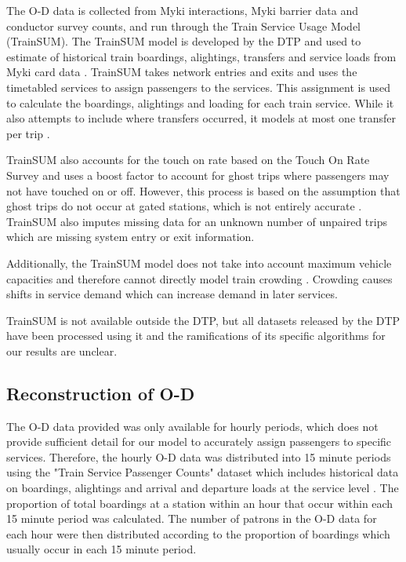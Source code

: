 The O-D data is collected from Myki interactions, Myki barrier data and conductor survey counts, and run through the Train Service Usage Model (TrainSUM). %
The TrainSUM model is developed by the DTP and used to estimate of historical train boardings, alightings, transfers and service loads from Myki card data \cite{rossmannRidespacePredictingShortterm2022}. TrainSUM takes network entries and exits and uses the timetabled services to assign passengers to the services. This assignment is used to calculate the boardings, alightings and loading for each train service. While it also attempts to include where transfers occurred, it models at most one transfer per trip \cite{victoriandepartmentoftransportandplanningTrainServicePassenger2024}.

TrainSUM also accounts for the touch on rate based on the Touch On Rate Survey and uses a boost factor to account for ghost trips where passengers may not have touched on or off. However, this process is based on the assumption that ghost trips do not occur at gated stations, which is not entirely accurate \cite{rossmannRidespacePredictingShortterm2022}. TrainSUM also imputes missing data for an unknown number of unpaired trips which are missing system entry or exit information. 

Additionally, the TrainSUM model does not take into account maximum vehicle capacities and therefore cannot directly model train crowding \cite{victoriandepartmentoftransportandplanningTrainServicePassenger2024}. Crowding causes shifts in service demand which can increase demand in later services. 

TrainSUM is not available outside the DTP, but all datasets released by the DTP have been processed using it and the ramifications of its specific algorithms for our results are unclear. 

\subsection{Reconstruction of O-D }
\label{subsec:data_recon}
The O-D data provided was only available for hourly periods, which does not provide sufficient detail for our model to accurately assign passengers to specific services. Therefore, the hourly O-D data was distributed into 15 minute periods using the "Train Service Passenger Counts" dataset which includes historical data on boardings, alightings and arrival and departure loads at the service level \cite{victoriandepartmentoftransportandplanningTrainServicePassenger2024}. The proportion of total boardings at a station within an hour that occur within each 15 minute period was calculated. The number of patrons in the O-D data for each hour were then distributed according to the proportion of boardings which usually occur in each 15 minute period. 

